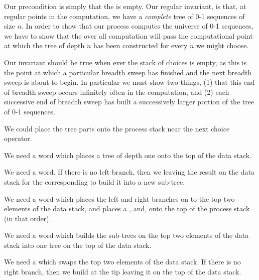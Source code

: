 Our precondition is simply that the  is empty. Our regular 
invariant, is that, at regular points in the computation, we have a 
\emph{complete} tree of 0-1 sequences of size $n$. In order to show that 
our process computes the  universe of 0-1 sequences, we 
 have to show that the over all computation will pass the 
computational point at which the tree of depth $n$ has been constructed 
for every $n$ we might choose. 

Our invariant should be true when ever the stack of choices is empty, as 
this is the point at which a particular breadth sweep has finished and the 
next breadth sweep is about to begin. In particular we must show two 
things, (1) that this end of breadth sweep occurs infinitely often in the 
computation, and (2) each successive end of breadth sweep has built a 
successively larger portion of the tree of 0-1 sequences. 

We could place the tree parts onto the process stack near the next choice 
operator. 

We need a  word which places a tree of depth one onto 
the top of the data stack. 

We need a  word. If there is no left branch, then 
we  leaving the result on the data stack for the 
corresponding  to build it into a new sub-tree.

We need a  word which places the left and right 
branches on to the top two elements of the data stack, and places a 
,  and,  onto the top of the process stack (in that order). 

We need a  word which builds the sub-trees on the top 
two elements of the data stack into one tree on the top of the data stack. 

We need a  which swaps the top two elements of 
the data stack. If there is no right branch, then we build at the tip 
leaving it on the top of the data stack.

